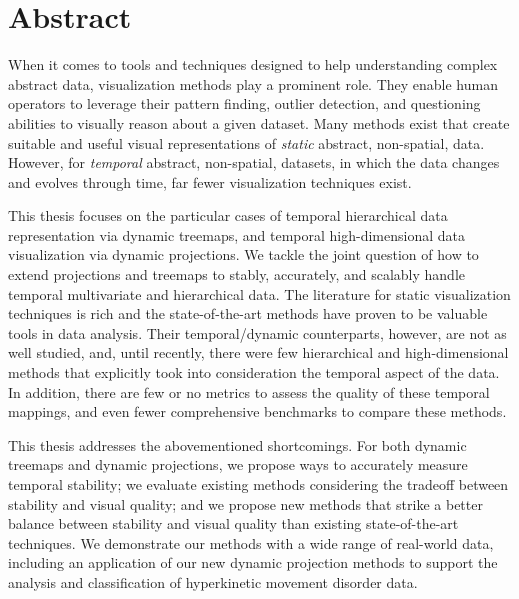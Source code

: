 \begingroup

\let\clearpage\relax
\let\cleardoublepage\relax
\let\cleardoublepage\relax

\manualmark
{} 

\chapter*{Abstract}

When it comes to tools and techniques designed to help understanding complex abstract data, visualization methods play a prominent role. They enable human operators to leverage their pattern finding, outlier detection, and questioning abilities to visually reason about a given dataset. Many methods exist that create suitable and useful visual representations of \emph{static} abstract, non-spatial, data. However, for \emph{temporal} abstract, non-spatial, datasets, in which the data changes and evolves through time, far fewer visualization techniques exist.

This thesis focuses on the particular cases of temporal hierarchical data representation via dynamic treemaps, and temporal high-dimensional data visualization via dynamic projections. We tackle the joint question of how to extend projections and treemaps to stably, accurately, and scalably handle temporal multivariate and hierarchical data. The literature for static visualization techniques is rich and the state-of-the-art methods have proven to be valuable tools in data analysis. Their temporal/dynamic counterparts, however, are not as well studied, and, until recently, there were few hierarchical and high-dimensional methods that explicitly took into consideration the temporal aspect of the data. In addition, there are few or no metrics to assess the quality of these temporal mappings, and even fewer comprehensive benchmarks to compare these methods. 

This thesis addresses the abovementioned shortcomings. For both dynamic treemaps and dynamic projections, we propose ways to accurately measure temporal stability; we evaluate existing methods considering the tradeoff between stability and visual quality; and we propose new methods that strike a better balance between stability and visual quality than existing state-of-the-art techniques. We demonstrate our methods with a wide range of real-world data, including an application of our new dynamic projection methods to support the analysis and classification of hyperkinetic movement disorder data.

